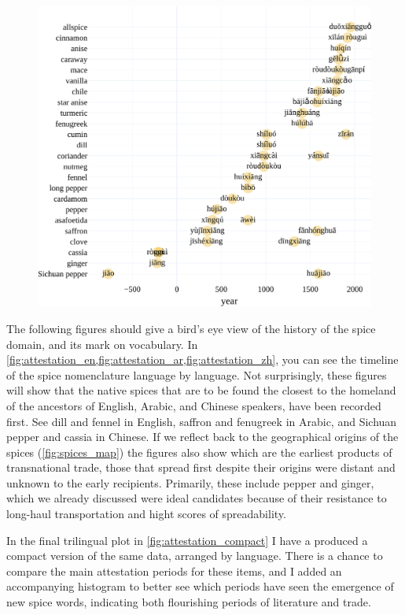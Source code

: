 \begin{figure}[!ht]
  \centering
  \includegraphics[width=\linewidth]{imgs/plots/attestation_zh.pdf}
  \caption{}
  \label{fig:attestation_zh}
\end{figure}

The following figures should give a bird's eye view of the history of the spice domain, and its mark on vocabulary. In \cref{fig:attestation_en,fig:attestation_ar,fig:attestation_zh}, you can see the timeline of the spice nomenclature language by language. Not surprisingly, these figures will show that the native spices that are to be found the closest to the homeland of the ancestors of English, Arabic, and Chinese speakers, have been recorded first. See dill and fennel in English, saffron and fenugreek in Arabic, and Sichuan pepper and cassia in Chinese. If we reflect back to the geographical origins of the spices (\cref{fig:spices_map}) the figures also show which are the earliest products of transnational trade, those that spread first despite their origins were distant and unknown to the early recipients. Primarily, these include pepper and ginger, which we already discussed were ideal candidates because of their resistance to long-haul transportation and hight scores of spreadability. 

In the final trilingual plot in \cref{fig:attestation_compact} I have a produced a compact version of the same data, arranged by language. There is a chance to compare the main attestation periods for these items, and I added an accompanying histogram to better see which periods have seen the emergence of new spice words, indicating both flourishing periods of literature and trade. 

